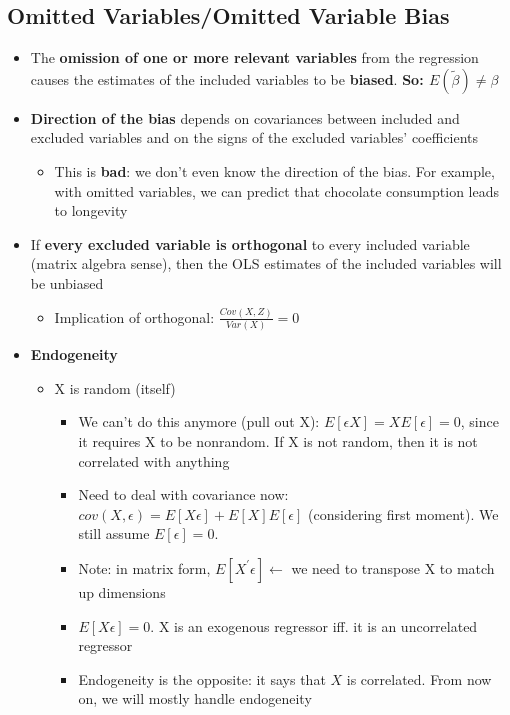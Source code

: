 \documentclass[10pt, oneside]{article}
\begin{document}
\subsection{Omitted Variables/Omitted Variable Bias}
\begin{itemize}
    \item The \textbf{omission of one or more relevant variables} from the regression causes the estimates of the included variables to be \textbf{biased}. \textbf{So: $E(\tilde \beta)\neq \beta$}
    \item \textbf{Direction of the bias }depends on covariances between included and excluded variables and on the signs of the excluded variables' coefficients
    \begin{itemize}
        \item This is \textbf{bad}: we don't even know the direction of the bias. For example, with omitted variables, we can predict that chocolate consumption leads to longevity
    \end{itemize}
    \item If \textbf{every excluded variable is orthogonal} to every included variable (matrix algebra sense), then the OLS estimates of the included variables will be unbiased
    \begin{itemize}
        \item Implication of orthogonal: $\frac{Cov(X,Z)}{Var(X)} = 0$
    \end{itemize}
    \item \textbf{Endogeneity}
    \begin{itemize}
        \item X is random (itself)
        \begin{itemize}
            \item We can't do this anymore (pull out X): $E[\epsilon X] = XE[\epsilon] = 0$, since it requires X to be nonrandom. If X is not random, then it is not correlated with anything
            \item Need to deal with covariance now: $cov(X,\epsilon) = E[X\epsilon] + E[X]E[\epsilon]$ (considering first moment). We still assume $E[\epsilon] = 0$.
            \item Note: in matrix form, $E[X^\prime \epsilon] \leftarrow$ we need to transpose X to match up dimensions
            \item $E[X\epsilon] = 0$. X is an exogenous regressor iff. it is an uncorrelated regressor
            \item Endogeneity is the opposite: it says that $X$ is correlated. From now on, we will mostly handle endogeneity

\end{itemize}
\end{itemize}
\end{itemize}
\end{document}

